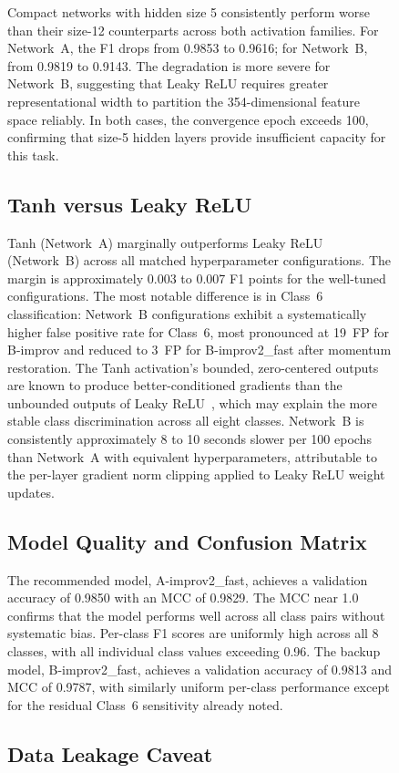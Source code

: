 \documentclass{acm_proc_article-sp} \usepackage{graphicx} \usepackage{amsmath} \usepackage{booktabs} \usepackage{url}
\begin{document}
\begin{figure}[ht]
{Compact networks with hidden size 5 consistently perform worse than their size-12 counterparts across both activation families. For Network~A, the F1 drops from 0.9853 to 0.9616; for Network~B, from 0.9819 to 0.9143. The degradation is more severe for Network~B, suggesting that Leaky ReLU requires greater representational width to partition the 354-dimensional feature space reliably. In both cases, the convergence epoch exceeds 100, confirming that size-5 hidden layers provide insufficient capacity for this task.

\subsection{Tanh versus Leaky ReLU}

Tanh (Network~A) marginally outperforms Leaky ReLU (Network~B) across all matched hyperparameter configurations. The margin is approximately 0.003 to 0.007 F1 points for the well-tuned configurations. The most notable difference is in Class~6 classification: Network~B configurations exhibit a systematically higher false positive rate for Class~6, most pronounced at 19~FP for B-improv and reduced to 3~FP for B-improv2_fast after momentum restoration. The Tanh activation's bounded, zero-centered outputs are known to produce better-conditioned gradients than the unbounded outputs of Leaky ReLU~\cite{lecun1998efficient}, which may explain the more stable class discrimination across all eight classes. Network~B is consistently approximately 8 to 10 seconds slower per 100 epochs than Network~A with equivalent hyperparameters, attributable to the per-layer gradient norm clipping applied to Leaky ReLU weight updates.

\subsection{Model Quality and Confusion Matrix}

The recommended model, A-improv2_fast, achieves a validation accuracy of 0.9850 with an MCC of 0.9829. The MCC near 1.0 confirms that the model performs well across all class pairs without systematic bias. Per-class F1 scores are uniformly high across all 8 classes, with all individual class values exceeding 0.96. The backup model, B-improv2_fast, achieves a validation accuracy of 0.9813 and MCC of 0.9787, with similarly uniform per-class performance except for the residual Class~6 sensitivity already noted.

\subsection{Data Leakage Caveat}

}
\end{figure}
\end{document}
